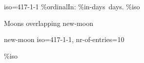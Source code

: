 \documentclass[paper=landscape]{scrartcl}
\begin{document}
\begin{multicols}{2}


\GetNextMoonphase {} { iso=417-1-1 } 
  {  
    \%{ordinal}\space In: \%{in-days}\ days. \%{iso} 
  }


Moons overlapping new-moon
\begin{itemize}
\CompareMoons { \Surios , \Eria } { new-moon } { iso=417-1-1, nr-of-entries=10 } 
  {
    \item {}  \%{iso} 
 }
 \end{itemize}
 
% 
\end{multicols}
\end{document}
